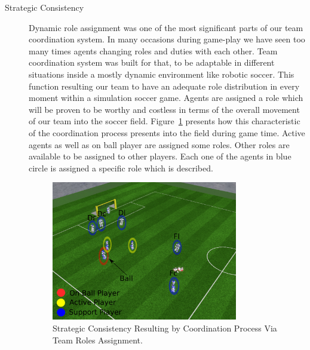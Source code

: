 \begin{description}
\item[Strategic Consistency]
Dynamic role assignment was one of the most significant parts of our team coordination system. In many occasions during game-play we have seen too many times agents changing roles and duties with each other. Team coordination system was built for that, to be adaptable in different situations inside a mostly dynamic environment like robotic soccer. This function resulting our team to have an adequate role distribution in every moment within a simulation soccer game. Agents are assigned a role which will be proven to be worthy and costless in terms of the overall movement of our team into the soccer field. Figure~\ref{fig:StrategicPositioning} presents how this characteristic of the coordination process presents into the field during game time. Active agents as well as on ball player are assigned some roles. Other roles are available to be assigned to other players. Each one of the agents in blue circle is assigned a specific role which is described.

\begin{figure}[t!]
\centering
  \includegraphics[width=0.8\textwidth]{Chapter5/figures/4.pdf}
  \caption{Strategic Consistency Resulting by Coordination Process Via Team Roles Assignment.} 
  \label{fig:StrategicPositioning}
\end{figure}

\end{description}


